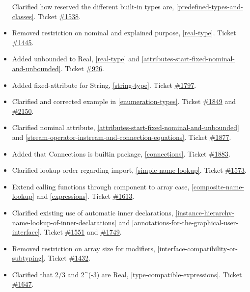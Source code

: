 \documentclass[10pt,a4paper]{report}
\begin{document}
\begin{itemize}
  Clarified how reserved the different built-in types are, \ref{predefined-types-and-classes}.
  Ticket \href{https://trac.modelica.org/Modelica/ticket/1538}{\#1538}.
\item
  Removed restriction on nominal and explained purpose, \ref{real-type}.
  Ticket \href{https://trac.modelica.org/Modelica/ticket/1445}{\#1445}.
\item
  Added unbounded to Real, \ref{real-type} and \ref{attributes-start-fixed-nominal-and-unbounded}. Ticket
  \href{https://trac.modelica.org/Modelica/ticket/926}{\#926}.
\item
  Added fixed-attribute for String, \ref{string-type}. Ticket
  \href{https://trac.modelica.org/Modelica/ticket/1797}{\#1797}.
\item
  Clarified and corrected example in \ref{enumeration-types}. Ticket
  \href{https://trac.modelica.org/Modelica/ticket/1849}{\#1849} and
  \href{https://trac.modelica.org/Modelica/ticket/2150}{\#2150}.
\item
  Clarified nominal attribute, \ref{attributes-start-fixed-nominal-and-unbounded} 
  and \ref{stream-operator-instream-and-connection-equations}. Ticket
  \href{https://trac.modelica.org/Modelica/ticket/1877}{\#1877}.
\item
  Added that Connections is builtin package, \ref{connections}. Ticket
  \href{https://trac.modelica.org/Modelica/ticket/1883}{\#1883}.
\item
  Clarified lookup-order regarding import, \ref{simple-name-lookup}. Ticket
  \href{https://trac.modelica.org/Modelica/ticket/1573}{\#1573}.
\item
  Extend calling functions through component to array case, \ref{composite-name-lookup} and \ref{expressions}. Ticket
  \href{https://trac.modelica.org/Modelica/ticket/1613}{\#1613}.
\item
  Clarified existing use of automatic inner declarations, \ref{instance-hierarchy-name-lookup-of-inner-declarations}
  and \ref{annotations-for-the-graphical-user-interface}. Ticket
  \href{https://trac.modelica.org/Modelica/ticket/1551}{\#1551} and
  \href{https://trac.modelica.org/Modelica/ticket/1749}{\#1749}.
\item
  Removed restriction on array size for modifiers, \ref{interface-compatibility-or-subtyping}. Ticket
  \href{https://trac.modelica.org/Modelica/ticket/1432}{\#1432}.
\item
  Clarified that 2/3 and 2\^{}(-3) are Real, \ref{type-compatible-expressions}. Ticket
  \href{https://trac.modelica.org/Modelica/ticket/1647}{\#1647}.

\end{itemize}
\end{document}
